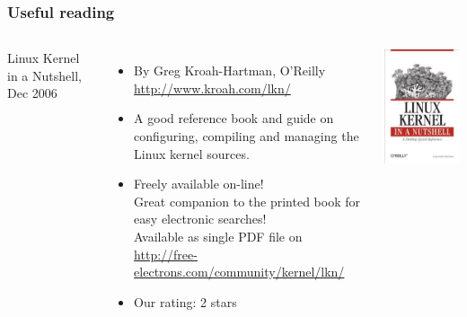 \begin{frame}
  \frametitle{Useful reading}
  \begin{columns}
    Linux Kernel in a Nutshell, Dec 2006
    \begin{itemize}
    \item By Greg Kroah-Hartman, O'Reilly\\
      \url{http://www.kroah.com/lkn/}
    \item A good reference book and guide on configuring, compiling
      and managing the Linux kernel sources.
    \item Freely available on-line!\\
      Great companion to the printed book for easy electronic searches!\\
      Available as single PDF file on
      \url{http://free-electrons.com/community/kernel/lkn/}
    \item Our rating: 2 stars
    \end{itemize}
    \includegraphics[width=\textwidth]{slides/sysdev-using-kernel-modules/linux-kernel-in-a-nutshell.jpg}
  \end{columns}
\end{frame}

